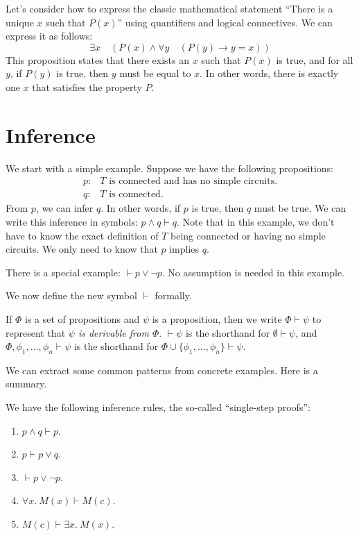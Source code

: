 \begin{example}
    Let's consider how to express the classic mathematical statement ``There is a unique $x$ such that $P(x)$'' using quantifiers and logical connectives. We can express it as follows:
    \[\exists x\quad (P(x) \wedge \forall y\quad (P(y) \rightarrow y = x))\]
    This proposition states that there exists an $x$ such that $P(x)$ is true, and for all $y$, if $P(y)$ is true, then $y$ must be equal to $x$. In other words, there is exactly one $x$ that satisfies the property $P$.
\end{example}

\section{Inference}
We start with a simple example. Suppose we have the following propositions:
\begin{align*}
    p\colon &T\text{ is connected and has no simple circuits.} \\
    q\colon &T\text{ is connected.}
\end{align*}
From $p$, we can infer $q$. In other words, if $p$ is true, then $q$ must be true. We can write this inference in symbols: $p\wedge q \vdash q$. Note that in this example, we don't have to know the exact definition of $T$ being connected or having no simple circuits. We only need to know that $p$ implies $q$. 

There is a special example: $\vdash p \vee \neg p$. No assumption is needed in this example. 

We now define the new symbol $\vdash$ formally.

\begin{definition}
    If $\Phi$ is a set of propositions and $\psi$ is a proposition, then we write $\Phi \vdash \psi$ to represent that \emph{$\psi$ is derivable from $\Phi$}. $\vdash\psi$ is the shorthand for $\emptyset \vdash \psi$, and $\Phi, \phi_1, \dots, \phi_n \vdash \psi$ is the shorthand for $\Phi \cup \{\phi_1, \dots, \phi_n\} \vdash \psi$.
\end{definition}

We can extract some common patterns from concrete examples. Here is a summary. 

\begin{example}
    We have the following inference rules, the so-called ``single-step proofs'':
    \begin{enumerate}[itemindent=0ex, itemsep=0pt, label=\upshape{(\alph*)}]
        \item $p\wedge q\vdash p$. 
        \item $p\vdash p\vee q$.
        \item $\vdash p\vee \neg p$.
        \item $\forall x.\ M(x)\vdash M(c)$.
        \item $M(c)\vdash \exists x.\ M(x)$.
    \end{enumerate}
\end{example}


